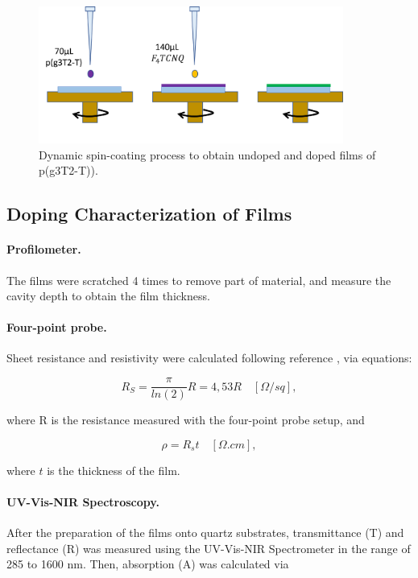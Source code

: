 \begin{figure}[ht]
  \centering
  \includegraphics[width=10cm]{Images/pdf/spin_coating.pdf}
  \caption{Dynamic spin-coating process to obtain undoped and doped films of p(g3T2-T)).}
  \label{fig:coating}
\end{figure}

\subsection{Doping Characterization of Films}

\paragraph{Profilometer.}The films were scratched 4 times to remove part of material, and measure the cavity depth to obtain the film thickness.

\paragraph{Four-point probe.}Sheet resistance and resistivity were calculated following reference \cite{resist}, via equations:

\begin{equation}\label{eq:rs}
	R_{S} = \frac{\pi}{ln(2)}R = 4,53 R \quad [\Omega/sq],
\end{equation}

where R is the resistance measured with the four-point probe setup, and

\begin{equation}\label{eq:resist}
	\rho = R_{s}t \quad [\Omega.cm],
\end{equation}
 
 where $t$ is the thickness of the film.

\paragraph{UV-Vis-NIR Spectroscopy.}After the preparation of the films onto quartz substrates, transmittance (T) and reflectance (R) was measured using the UV-Vis-NIR Spectrometer in the range of 285 to 1600 nm. Then, absorption (A) was calculated via

